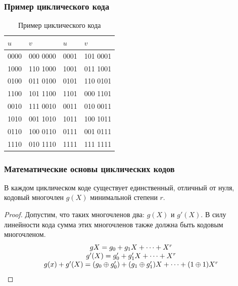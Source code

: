 \begin{frame}
    \frametitle{Пример циклического кода}
    \begin{table}[ht]
        \caption{Пример циклического кода}\label{t:cyclicExample}
        \centering
        \begin{tabular}[c]{|l|l||l|l|}
            \hline\hline
            $u$     &$v$        &$u$    &$v$\\
            \hline\hline
            0000    &000 0000   &0001   &101 0001\\
            1000    &110 1000   &1001   &011 1001\\
            0100    &011 0100   &0101   &110 0101\\
            1100    &101 1100   &1101   &000 1101\\
            0010    &111 0010   &0011   &010 0011\\
            1010    &001 1010   &1011   &100 1011\\
            0110    &100 0110   &0111   &001 0111\\
            1110    &010 1110   &1111   &111 1111\\
            \hline
        \end{tabular}
    \end{table}
\end{frame}


\begin{frame}
    \frametitle{Математические основы циклических кодов}
    
    \begin{theorem}
        В каждом циклическом коде существует единственный, отличный от нуля, кодовый многочлен $g(X)$ минимальной степени $r$.
    \end{theorem}

    \begin{proof}
        Допустим, что таких многочленов два: $g(X)$ и $g'(X)$. В силу линейности кода сумма этих многочленов также должна быть кодовым многочленом.
        \[
            \begin{array}[c]{c}
                g{X}=g_0+g_1X+\cdots+X^r\\
                g'(X)=g'_0+g'_1X+\cdots+X^r\\
                g(x)+g'(X)=(g_0\oplus g'_0)+(g_1\oplus g'_1)X+\cdots+(1\oplus 1)X^r
            \end{array}
        \]
    \end{proof}
\end{frame}


